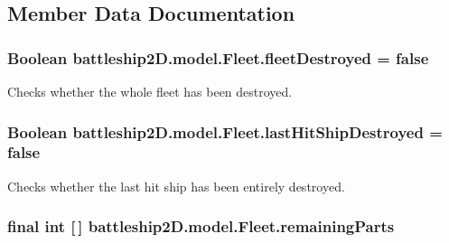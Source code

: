 \subsection{Member Data Documentation}
\hypertarget{classbattleship2D_1_1model_1_1Fleet_aa99ad6c0b52656c039a1b6e77d7a4f63}{
\subsubsection[{fleet\-Destroyed}]{\setlength{\rightskip}{0pt plus 5cm}Boolean battleship2\-D.\-model.\-Fleet.\-fleet\-Destroyed = false\hspace{0.3cm}{\ttfamily [private]}}}\label{classbattleship2D_1_1model_1_1Fleet_aa99ad6c0b52656c039a1b6e77d7a4f63}


Checks whether the whole fleet has been destroyed. 

\hypertarget{classbattleship2D_1_1model_1_1Fleet_ac9245d7670e8ba55860fccead366b077}{
\subsubsection[{last\-Hit\-Ship\-Destroyed}]{\setlength{\rightskip}{0pt plus 5cm}Boolean battleship2\-D.\-model.\-Fleet.\-last\-Hit\-Ship\-Destroyed = false\hspace{0.3cm}{\ttfamily [private]}}}\label{classbattleship2D_1_1model_1_1Fleet_ac9245d7670e8ba55860fccead366b077}


Checks whether the last hit ship has been entirely destroyed. 

\hypertarget{classbattleship2D_1_1model_1_1Fleet_acdbb1599e55f36117c255ee49df1148b}{
\subsubsection[{remaining\-Parts}]{\setlength{\rightskip}{0pt plus 5cm}final int \mbox{[}$\,$\mbox{]} battleship2\-D.\-model.\-Fleet.\-remaining\-Parts\hspace{0.3cm}{\ttfamily [private]}}}\label{classbattleship2D_1_1model_1_1Fleet_acdbb1599e55f36117c255ee49df1148b}


